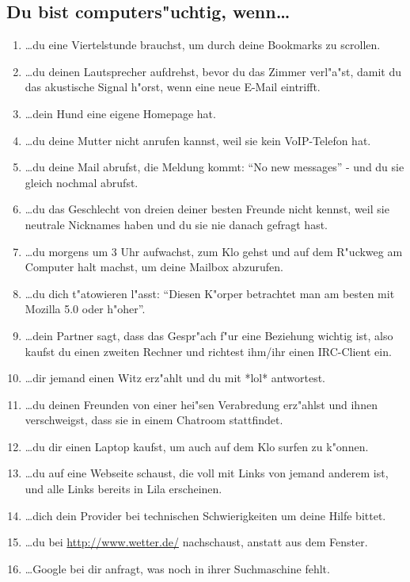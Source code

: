 \subsection*{\Large{Du bist computers"uchtig, wenn\ldots}}

\begin{enumerate}
\item \ldots du eine Viertelstunde brauchst, um durch deine Bookmarks zu scrollen.
\item \ldots du deinen Lautsprecher aufdrehst, bevor du das Zimmer verl"a"st, damit du das akustische Signal h"orst, wenn eine neue E-Mail eintrifft.
\item \ldots dein Hund eine eigene Homepage hat.
\item \ldots du deine Mutter nicht anrufen kannst, weil sie kein VoIP-Telefon hat.
\item \ldots du deine Mail abrufst, die Meldung kommt: "`No new messages"' - und du sie gleich nochmal abrufst.
\item \ldots du das Geschlecht von dreien deiner besten Freunde nicht kennst, weil sie neutrale Nicknames haben und du sie nie danach gefragt hast.
\item \ldots du morgens um 3 Uhr aufwachst, zum Klo gehst und auf dem R"uckweg am Computer halt machst, um deine Mailbox abzurufen.
\item \ldots du dich t"atowieren l"asst: "`Diesen K"orper betrachtet man am besten mit Mozilla 5.0 oder h"oher"'.
\item \ldots dein Partner sagt, dass das Gespr"ach f"ur eine Beziehung wichtig ist, also kaufst du einen zweiten Rechner und richtest ihm/ihr einen IRC-Client ein.
\item \ldots dir jemand einen Witz erz"ahlt und du mit *lol* antwortest.
\item \ldots du deinen Freunden von einer hei"sen Verabredung erz"ahlst und ihnen verschweigst, dass sie in einem Chatroom stattfindet.
\item \ldots du dir einen Laptop kaufst, um auch auf dem Klo surfen zu k"onnen.
\item \ldots du auf eine Webseite schaust, die voll mit Links von jemand anderem ist, und alle Links bereits in Lila erscheinen.
\item \ldots dich dein Provider bei technischen Schwierigkeiten um deine Hilfe bittet.
\item \ldots du bei \url{http://www.wetter.de/} nachschaust, anstatt aus dem Fenster.
\item \ldots Google bei dir anfragt, was noch in ihrer Suchmaschine fehlt.

\end{enumerate}
